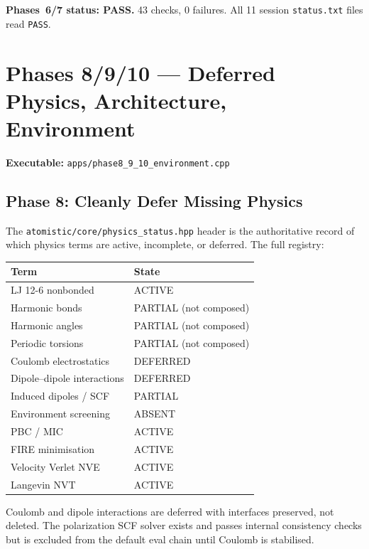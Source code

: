 \documentclass[11pt]{article}
\begin{document}
\textbf{Phases~6/7 status: PASS.}  43 checks, 0 failures.  All 11 session
\texttt{status.txt} files read \texttt{PASS}.

\section{Phases 8/9/10 --- Deferred Physics, Architecture, Environment}

\textbf{Executable:} \texttt{apps/phase8\_9\_10\_environment.cpp}

\subsection{Phase 8: Cleanly Defer Missing Physics}

The \texttt{atomistic/core/physics\_status.hpp} header is the
authoritative record of which physics terms are active, incomplete, or
deferred.  The full registry:

\begin{center}
\begin{tabular}{ll}
\toprule
Term & State \\
\midrule
LJ 12-6 nonbonded          & ACTIVE \\
Harmonic bonds              & PARTIAL (not composed) \\
Harmonic angles             & PARTIAL (not composed) \\
Periodic torsions           & PARTIAL (not composed) \\
Coulomb electrostatics      & DEFERRED \\
Dipole--dipole interactions & DEFERRED \\
Induced dipoles / SCF       & PARTIAL \\
Environment screening       & ABSENT \\
PBC / MIC                   & ACTIVE \\
FIRE minimisation           & ACTIVE \\
Velocity Verlet NVE         & ACTIVE \\
Langevin NVT                & ACTIVE \\
\bottomrule
\end{tabular}
\end{center}

Coulomb and dipole interactions are deferred with interfaces preserved,
not deleted.  The polarization SCF solver exists and passes internal
consistency checks but is excluded from the default eval chain until
Coulomb is stabilised.
\end{document}
